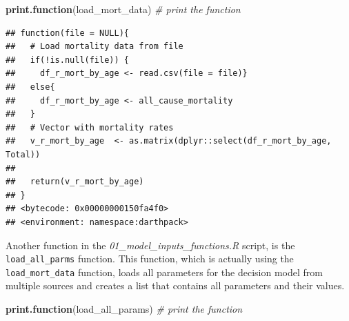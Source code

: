 \documentclass[]{book}
\newenvironment{Shaded}{\begin{snugshade}}{\end{snugshade}}
\newcommand{\CommentTok}[1]{\textcolor[rgb]{0.56,0.35,0.01}{\textit{#1}}}
\newcommand{\KeywordTok}[1]{\textcolor[rgb]{0.13,0.29,0.53}{\textbf{#1}}}
\newcommand{\NormalTok}[1]{#1}
\begin{document}
\begin{Shaded}
\begin{Highlighting}[]
\KeywordTok{print.function}\NormalTok{(load_mort_data) }\CommentTok{# print the function}
\end{Highlighting}
\end{Shaded}

\begin{verbatim}
## function(file = NULL){
##   # Load mortality data from file
##   if(!is.null(file)) {
##     df_r_mort_by_age <- read.csv(file = file)}
##   else{
##     df_r_mort_by_age <- all_cause_mortality
##   }
##   # Vector with mortality rates
##   v_r_mort_by_age  <- as.matrix(dplyr::select(df_r_mort_by_age, Total))
##   
##   return(v_r_mort_by_age)
## }
## <bytecode: 0x00000000150fa4f0>
## <environment: namespace:darthpack>
\end{verbatim}

Another function in the \emph{01\_model\_inputs\_functions.R} script, is the \texttt{load\_all\_parms} function. This function, which is actually using the \texttt{load\_mort\_data} function, loads all parameters for the decision model from multiple sources and creates a list that contains all parameters and their values.

\begin{Shaded}
\begin{Highlighting}[]
\KeywordTok{print.function}\NormalTok{(load_all_params)  }\CommentTok{# print the function}
\end{Highlighting}
\end{Shaded}
\end{document}
